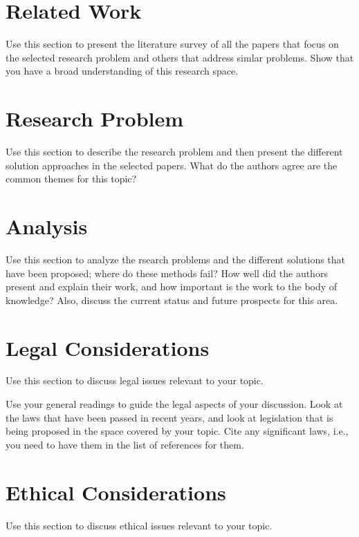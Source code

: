 \documentclass[sigconf, anonymous]{acmart}
\begin{document}
\section{Related Work}
\label{related}

Use this section to present the literature survey of all the papers
that focus on the selected research problem and others that address
simlar problems. Show that you have a broad understanding of this
research space.

\section{Research Problem}
\label{research problem}

Use this section to describe the research problem and then present the
different solution approaches in the selected papers. What do the
authors agree are the common themes for this topic?

\section{Analysis}
\label{analysis}

Use this section to analyze the rsearch problems and the different
solutions that have been proposed; where do these methods fail? How
well did the authors present and explain their work, and how important
is the work to the body of knowledge? Also, discuss the current status
and future prospects for this area.

\section{Legal Considerations}
\label{legal considerations}

Use this section to discuss legal issues relevant to your topic.

Use your general readings to guide the legal aspects of your
discussion. Look at the laws that have been passed in recent years,
and look at legislation that is being proposed in the space covered by
your topic. Cite any significant laws, i.e., you need to have them in
the list of references for them.

\section{Ethical Considerations}
\label{ethical considerations}

Use this section to discuss ethical issues relevant to your topic.
\end{document}
